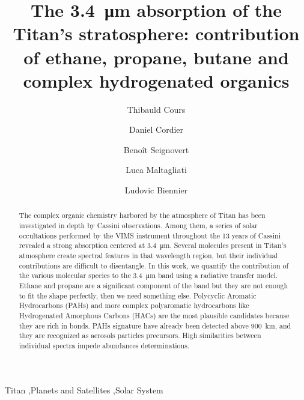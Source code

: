 \documentclass{arxiv-icarus}
\begin{document}
\begin{frontmatter}
\title{The \SI{3.4}{\um} absorption of the Titan's stratosphere: contribution of ethane, propane, butane and complex hydrogenated organics}

\author[GSMA]{Thibauld Cours}
\author[GSMA]{Daniel Cordier}
\author[JPL,GSMA]{Beno\^{i}t Seignovert}
\author[Nature]{Luca Maltagliati}
\author[IPR]{Ludovic Biennier}

\address[GSMA]{Universit\'{e} de Reims Champagne Ardenne, CNRS, GSMA UMR 7331, 51097 Reims, France}
\address[JPL]{Jet Propulsion Laboratory, California Institute of Technology, Pasadena, CA 91109, USA}
\address[Nature]{Nature Astronomy, Springer Nature, 4 Crinan Street, N1 9XW London, UK}
\address[IPR]{Institut de Physique de Rennes, UMR CNRS 6251, 35042 Rennes, France}

\begin{abstract}
The complex organic chemistry harbored by the atmosphere of Titan has been investigated in depth by Cassini observations.
Among them, a series of solar occultations performed by the VIMS instrument throughout the 13 years of Cassini revealed a strong absorption centered at \SI{3.4}{\um}.
Several molecules present in Titan's atmosphere create spectral features in that wavelength region, but their individual contributions are difficult to disentangle.
In this work, we quantify the contribution of the various molecular species to the \SI{3.4}{\um} band using a radiative transfer model.
Ethane and propane are a significant component of the band but they are not enough to fit the shape perfectly, then we need something else.
Polycyclic Aromatic Hydrocarbons (PAHs) and more complex polyaromatic hydrocarbons like Hydrogenated Amorphous Carbons (HACs) are the most plausible candidates because they are rich in  bonds.
PAHs signature have already been detected above \SI{900}{km}, and they are recognized as aerosols particles precursors. High similarities between individual spectra impede abundances determinations.
\end{abstract}

\begin{keyword}
Titan \sep Planets and Satellites \sep Solar System
\end{keyword}

\end{frontmatter}

\end{document}

